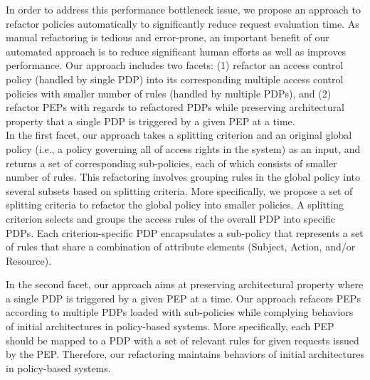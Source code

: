 In order to address this performance bottleneck issue,
we propose an approach to refactor policies automatically to significantly reduce
request evaluation time.
As manual refactoring is tedious and
error-prone, an important benefit of our automated approach is to reduce significant human efforts as well as
improves performance.
Our approach includes two facets: (1) refactor an access control policy (handled by single PDP) into its corresponding multiple access
control policies with smaller number of rules (handled by multiple PDPs),
and (2) refactor PEPs with regards to refactored PDPs while preserving architectural property that a single PDP is triggered by a given PEP at a time.\\

In the first facet, our approach takes a splitting criterion and an original global policy (i.e., a policy governing all of access rights in the system) as an input, and returns a set of 
corresponding sub-policies, each of which consists of smaller number of rules.
This refactoring involves grouping rules in the global policy  into several subsets based on splitting criteria.
More specifically, we propose a set of splitting criteria to
refactor the global policy into smaller policies.
A splitting criterion selects and groups the access rules of the overall PDP into specific PDPs.
Each criterion-specific PDP encapsulates a sub-policy that represents a set of rules that share a combination
of attribute elements (Subject, Action, and/or Resource).

In the second facet, our approach aims at preserving architectural property where a single PDP is triggered by a given PEP at a time.
Our approach refacors PEPs according to multiple PDPs loaded with sub-policies while complying behaviors of initial architectures in policy-based systems. More specifically, each PEP should be mapped to a PDP with a set of relevant rules for given requests issued by the PEP.
Therefore, our refactoring maintains behaviors of initial architectures in policy-based systems.
 





